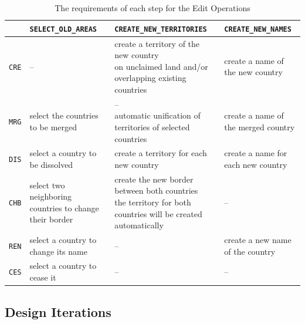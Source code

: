 \begin{table}[H]
\begin{center}
\begin{tabular}{m{0.9cm} m{4.0cm} m{4.4cm} m{3.8cm}}
  \toprule

  &
  \texttt{SELECT\_OLD\_AREAS} &
  \texttt{CREATE\_NEW\_TERRITORIES} &
  \texttt{CREATE\_NEW\_NAMES} \\

  \midrule
  \texttt{CRE} &
  -- &
  \pbox{4.4cm}{create a territory of the new country\\
  \footnotesize{on unclaimed land and/or overlapping existing countries}} &
  create a name of the new country \\

  \midrule
  \texttt{MRG} &
  select the countries to be merged &
  \pbox{4.4cm}{--\\
  \footnotesize{automatic unification of territories of selected countries}} &
  create a name of the merged country
  \\

  \midrule
  \texttt{DIS} &
  select a country to be \mbox{dissolved} &
  create a territory for each new country &
  create a name for each new country \\

  \midrule
  \texttt{CHB} &
  select two neighboring countries to change their border &
  \pbox{4.4cm}{create the new border between both countries \\
  \footnotesize{the territory for both countries will be created automatically}}  &
  -- \\

  \midrule
  \texttt{REN} &
  select a country to change its name &
  -- &
  create a new name of the country \\

  \midrule
  \texttt{CES} &
  select a country to cease it &
  -- &
  -- \\

  \bottomrule
\end{tabular}
\caption{The requirements of each step for the Edit Operations}
\label{tab:editoperations_in_worklow}
\end{center}
\end{table}



\subsection{Design Iterations} %
\label{sub:design_iterations}

